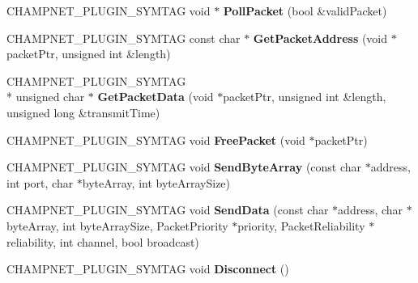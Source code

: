 \begin{DoxyCompactItemize}
\item 
\hypertarget{namespace_champ_net_plugin_abb7c7dca9d557ab9cd6b29fbb6a75785}{C\-H\-A\-M\-P\-N\-E\-T\-\_\-\-P\-L\-U\-G\-I\-N\-\_\-\-S\-Y\-M\-T\-A\-G void $\ast$ {\bfseries Poll\-Packet} (bool \&valid\-Packet)}\label{namespace_champ_net_plugin_abb7c7dca9d557ab9cd6b29fbb6a75785}

\item 
\hypertarget{namespace_champ_net_plugin_aeada1879c38a3ec33c57b15ba63fa53d}{C\-H\-A\-M\-P\-N\-E\-T\-\_\-\-P\-L\-U\-G\-I\-N\-\_\-\-S\-Y\-M\-T\-A\-G const char $\ast$ {\bfseries Get\-Packet\-Address} (void $\ast$packet\-Ptr, unsigned int \&length)}\label{namespace_champ_net_plugin_aeada1879c38a3ec33c57b15ba63fa53d}

\item 
\hypertarget{namespace_champ_net_plugin_acd1de52a8a043992fd80521d459ba977}{C\-H\-A\-M\-P\-N\-E\-T\-\_\-\-P\-L\-U\-G\-I\-N\-\_\-\-S\-Y\-M\-T\-A\-G \\*
unsigned char $\ast$ {\bfseries Get\-Packet\-Data} (void $\ast$packet\-Ptr, unsigned int \&length, unsigned long \&transmit\-Time)}\label{namespace_champ_net_plugin_acd1de52a8a043992fd80521d459ba977}

\item 
\hypertarget{namespace_champ_net_plugin_a713f269ee3388251cca3c05b331bcb77}{C\-H\-A\-M\-P\-N\-E\-T\-\_\-\-P\-L\-U\-G\-I\-N\-\_\-\-S\-Y\-M\-T\-A\-G void {\bfseries Free\-Packet} (void $\ast$packet\-Ptr)}\label{namespace_champ_net_plugin_a713f269ee3388251cca3c05b331bcb77}

\item 
\hypertarget{namespace_champ_net_plugin_aa200f86d409d3024b59ff9398b531797}{C\-H\-A\-M\-P\-N\-E\-T\-\_\-\-P\-L\-U\-G\-I\-N\-\_\-\-S\-Y\-M\-T\-A\-G void {\bfseries Send\-Byte\-Array} (const char $\ast$address, int port, char $\ast$byte\-Array, int byte\-Array\-Size)}\label{namespace_champ_net_plugin_aa200f86d409d3024b59ff9398b531797}

\item 
\hypertarget{namespace_champ_net_plugin_a50b06a48ff0ffb5f98dc98a8b29546ad}{C\-H\-A\-M\-P\-N\-E\-T\-\_\-\-P\-L\-U\-G\-I\-N\-\_\-\-S\-Y\-M\-T\-A\-G void {\bfseries Send\-Data} (const char $\ast$address, char $\ast$byte\-Array, int byte\-Array\-Size, Packet\-Priority $\ast$priority, Packet\-Reliability $\ast$reliability, int channel, bool broadcast)}\label{namespace_champ_net_plugin_a50b06a48ff0ffb5f98dc98a8b29546ad}

\item 
\hypertarget{namespace_champ_net_plugin_ad73dddb34e26ec660742e00a0d41fee5}{C\-H\-A\-M\-P\-N\-E\-T\-\_\-\-P\-L\-U\-G\-I\-N\-\_\-\-S\-Y\-M\-T\-A\-G void {\bfseries Disconnect} ()}\label{namespace_champ_net_plugin_ad73dddb34e26ec660742e00a0d41fee5}


\end{DoxyCompactItemize}
